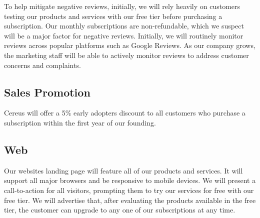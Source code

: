 To help mitigate negative reviews, initially, we will rely heavily on customers testing our products and services with our free tier before purchasing a subscription. Our monthly subscriptions are non-refundable, which we suspect will be a major factor for negative reviews. Initially, we will routinely monitor reviews across popular platforms such as Google Reviews. As our company grows, the marketing staff will be able to actively monitor reviews to address customer concerns and complaints.

\subsection{Sales Promotion}

Cereus will offer a 5\% early adopters discount to all customers who purchase a subscription within the first year of our founding.

\subsection{Web}

Our websites landing page will feature all of our products and services. It will support all major browsers and be responsive to mobile devices. We will present a call-to-action for all visitors, prompting them to try our services for free with our free tier. We will advertise that, after evaluating the products available in the free tier, the customer can upgrade to any one of our subscriptions at any time.
 


